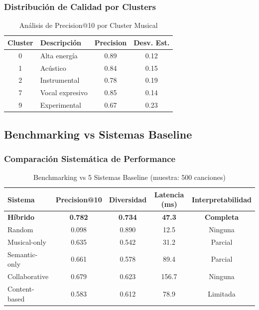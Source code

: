 \documentclass[12pt,a4paper]{report}
\begin{document}
\subsubsection{Distribución de Calidad por Clusters}

\begin{table}[H]
\centering
\caption{Análisis de Precision@10 por Cluster Musical}
\begin{tabular}{|c|l|c|c|}
\hline
\textbf{Cluster} & \textbf{Descripción} & \textbf{Precision} & \textbf{Desv. Est.} \\
\hline
0 & Alta energía & 0.89 & 0.12 \\
\hline
1 & Acústico & 0.84 & 0.15 \\
\hline
2 & Instrumental & 0.78 & 0.19 \\
\hline
7 & Vocal expresivo & 0.85 & 0.14 \\
\hline
9 & Experimental & 0.67 & 0.23 \\
\hline
\end{tabular}
\end{table}

\subsection{Benchmarking vs Sistemas Baseline}

\subsubsection{Comparación Sistemática de Performance}

\begin{table}[H]
\centering
\caption{Benchmarking vs 5 Sistemas Baseline (muestra: 500 canciones)}
\begin{tabular}{|l|c|c|c|c|}
\hline
\textbf{Sistema} & \textbf{Precision@10} & \textbf{Diversidad} & \textbf{Latencia (ms)} & \textbf{Interpretabilidad} \\
\hline
\textbf{Híbrido} & \textbf{0.782} & \textbf{0.734} & \textbf{47.3} & \textbf{Completa} \\
\hline
Random & 0.098 & 0.890 & 12.5 & Ninguna \\
\hline
Musical-only & 0.635 & 0.542 & 31.2 & Parcial \\
\hline
Semantic-only & 0.661 & 0.578 & 89.4 & Parcial \\
\hline
Collaborative & 0.679 & 0.623 & 156.7 & Ninguna \\
\hline
Content-based & 0.583 & 0.612 & 78.9 & Limitada \\
\hline
\end{tabular}
\end{table}
\end{document}

